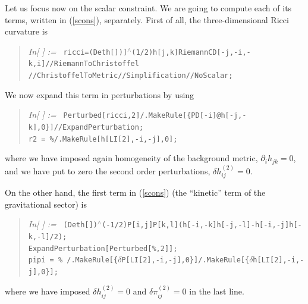 \documentclass[11pt,tightenlines,eqsecnum,floats,aps,amsmath,amssymb,nofootinbib,prd,floatfix]{revtex4}
\def\r{\right}
\newcommand{\<}{\langle}
\renewcommand{\>}{\rangle}
\newcounter{inout}
\newcommand{\inoutput}{%
	\stepcounter{inout}%
	\theinout}
\newcommand{\mathIn}[1]{
	\begin{quotation}\hspace*{-2.5cm} {\em In[\inoutput] :=\ } {\tt #1} \end{quotation}}
\begin{document}
Let us focus now on the scalar constraint. We are going to compute each of its terms, written in (\ref{scons}), separately. First of all,  the three-dimensional Ricci curvature is
%
\mathIn{ricci=(Deth[])]$^{\wedge}$(1/2)h[j,k]RiemannCD[-j,-i,-k,i]//RiemannToChristoffel\\//ChristoffelToMetric//Simplification//NoScalar;}
%
We now expand this term in perturbations by using
%
\mathIn{Perturbed[ricci,2]/.MakeRule[\{PD[-i]@h[-j,-k],0\}]//ExpandPerturbation;
  \\r2\,=\,\%/.MakeRule[{h[LI[2],-i,-j],0}];}
%
where we have  imposed again  homogeneity of the background metric, $\partial_ih_{jk}=0$, and we have put to zero the second order perturbations, $\delta h^{(2)}_{ij}=0$. 

On the other hand, the first term in (\ref{scons}) (the ``kinetic''  term of the gravitational sector)  is 
%
\mathIn{(Deth[])$^{\wedge}$(-1/2)P[i,j]P[k,l](h[-i,-k]h[-j,-l]-h[-i,-j]h[-k,-l]/2);\\
ExpandPerturbation[Perturbed[\%,2]];\\
pipi\,=\,\%\,/.MakeRule[\{$\delta$P[LI[2],-i,-j],0\}]/.MakeRule[\{$\delta$h[LI[2],-i,-j],0\}];}
%
where we have imposed $\delta h^{(2)}_{ij}=0$ and $\delta \pi^{(2)}_{ij}=0$ in the last line.
\end{document}
